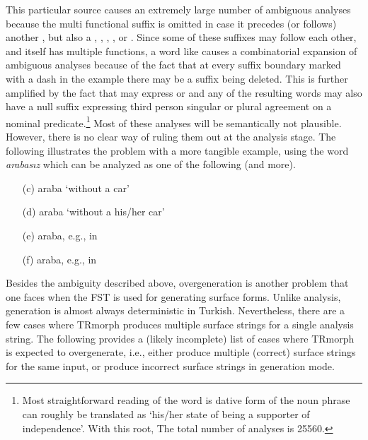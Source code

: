 \documentclass[twocolumn]{article}
\begin{document}
\begin{enumerate}
This particular source causes an extremely large number of ambiguous
analyses because the multi functional suffix  is omitted in
case it precedes (or follows) another , but also a
, , , ,  or
. Since some of these suffixes may follow each other, and
 itself has multiple functions, a word like
 causes a combinatorial expansion of
ambiguous analyses because of the fact that at every suffix boundary
marked with a dash in the example there may be a  suffix
being deleted. This is further amplified by the fact that 
may express  or  and any of the resulting
words may also have a null suffix expressing third person singular or
plural agreement on a nominal predicate.\footnote{Most straightforward
reading of the word is dative form of the noun phrase can roughly be
translated as `his/her state of being a supporter of independence'.
With this root, The total number of analyses is 25560.} Most of
these analyses will be semantically not plausible. However, there is
no clear way of ruling them out at the analysis stage. The following
illustrates the problem with a more tangible example, using the word
\emph{arabasız} which can be analyzed as one of the following (and
more).

\begin{enumerate}
\item[(c)] araba `without a car'
\item[(d)] araba `without a his/her car'
\item[(e)] araba, e.g., in 
\item[(f)] araba, e.g., in 
\end{enumerate}

\end{enumerate}

Besides the ambiguity described above, overgeneration is another
problem that one faces when the FST is used for generating surface
forms. Unlike analysis, generation is almost always deterministic in
Turkish.
Nevertheless, there are a few cases where TRmorph produces multiple
surface strings for a single analysis string. The following provides a
(likely incomplete) list of cases where TRmorph is expected
to overgenerate, i.e., either produce multiple (correct) surface
strings for the same input, or produce incorrect surface strings in
generation mode.
\end{document}
